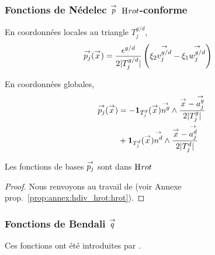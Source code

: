     \subsubsection[Fonctions de Nédélec p Hrot-conforme]{Fonctions de Nédelec \(\vect{p}\) \(\Hrot\)-conforme}

      \begin{minipage}{0.45\textwidth}
        \begin{center}
          \begin{tikzpicture}[scale=1]
            
          \end{tikzpicture}
        \end{center}
        \label{fig:form_int:fon_base:p}
      \end{minipage}
      \begin{minipage}{0.54\textwidth}
        En coordonnées locales au triangle \(T_j^{g/d}\),
        \begin{align*}
          \pj(\vx) &= \frac{\epsilon^{g/d}}{2|T_j^{g/d}|}\left(\xi_2 \vect{v_j^{g/d}}-\xi_1 \vect{w_j^{g/d}}\right)
        \end{align*}

        En coordonnées globales,
        \begin{align*}
          \pj(\vx)
          &= -\mathbf{1}_{T_j^g}(\vx)\vect{n^g} \pvect \frac{\vx-\vect{a_j^g}}{2|T_j^g|} \\
          & + \mathbf{1}_{T_j^d}(\vx)\vect{n^d} \pvect \frac{\vx-\vect{a_j^d}}{2|T_j^d|}
        \end{align*}
      \end{minipage}

      \begin{prop}
        Les fonctions de bases \(\pj\) sont dans \(\Hrot\)
      \end{prop}
      \begin{proof}
        Nous renvoyons au travail de \cite{nedelec_mixed_1980} (voir Annexe prop.~\ref{prop:annex:hdiv_hrot:hrot}).
      \end{proof}

    \subsubsection[Fonctions de Bendali q]{Fonctions de Bendali \(\vect{q}\)}

      Ces fonctions ont été introduites par \cite[eq.~28]{bendali_boundary-element_1999}.

